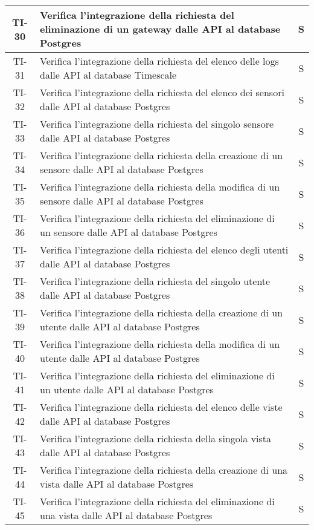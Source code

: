 \begin{center}
\begin{longtable}{|c|p{12cm}|c|}
			\hline
			TI-30 & Verifica l'integrazione della richiesta del eliminazione di un gateway dalle API al database Postgres & S \\
			\hline
			TI-31 & Verifica l'integrazione della richiesta del elenco delle logs dalle API al database Timescale & S \\
			\hline
			TI-32 & Verifica l'integrazione della richiesta del elenco dei sensori dalle API al database Postgres & S \\
			\hline
			TI-33 & Verifica l'integrazione della richiesta del singolo sensore dalle API al database Postgres & S \\
			\hline
			TI-34 & Verifica l'integrazione della richiesta della creazione di un sensore dalle API al database Postgres & S \\
			\hline
			TI-35 & Verifica l'integrazione della richiesta della modifica di un sensore dalle API al database Postgres & S \\
			\hline
			TI-36 & Verifica l'integrazione della richiesta del eliminazione di un sensore dalle API al database Postgres & S \\
			\hline
			TI-37 & Verifica l'integrazione della richiesta del elenco degli utenti dalle API al database Postgres & S \\
			\hline
			TI-38 & Verifica l'integrazione della richiesta del singolo utente dalle API al database Postgres & S \\
			\hline
			TI-39 & Verifica l'integrazione della richiesta della creazione di un utente dalle API al database Postgres & S \\
			\hline
			TI-40 & Verifica l'integrazione della richiesta della modifica di un utente dalle API al database Postgres & S \\
			\hline
			TI-41 & Verifica l'integrazione della richiesta del eliminazione di un utente dalle API al database Postgres & S \\
			\hline
			TI-42 & Verifica l'integrazione della richiesta del elenco delle viste dalle API al database Postgres & S \\
			\hline
			TI-43 & Verifica l'integrazione della richiesta della singola vista dalle API al database Postgres & S \\
			\hline
			TI-44 & Verifica l'integrazione della richiesta della creazione di una vista dalle API al database Postgres & S \\
			\hline
			TI-45 & Verifica l'integrazione della richiesta del eliminazione di una vista dalle API al database Postgres & S \\

\end{longtable}
\end{center}
